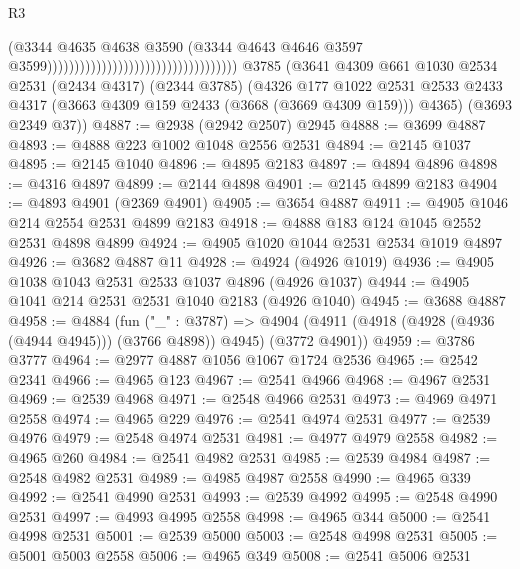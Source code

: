 \begin{lexlean}{R3}
\begin{coremodule}
                                                                      (@3344
                                                                        @4635
                                                                        @4638
                                                                        @3590
                                                                        (@3344
                                                                          @4643
                                                                          @4646
                                                                          @3597
                                                                          @3599)))))))))))))))))))))))))))))))))))
    @3785
    (@3641
      @4309
      @661
      @1030
      @2534
      @2531
      (@2434 @4317)
      (@2344 @3785)
      (@4326
        @177
        @1022
        @2531
        @2533
        @2433
        @4317
        (@3663 @4309 @159 @2433 (@3668 (@3669 @4309 @159)))
        @4365)
      (@3693 @2349 @37))
@4887 := @2938 (@2942 @2507) @2945
@4888 := @3699 @4887
@4893 := @4888 @223 @1002 @1048 @2556 @2531
@4894 := @2145 @1037
@4895 := @2145 @1040
@4896 := @4895 @2183
@4897 := @4894 @4896
@4898 := @4316 @4897
@4899 := @2144 @4898
@4901 := @2145 @4899 @2183
@4904 := @4893 @4901 (@2369 @4901)
@4905 := @3654 @4887
@4911 := @4905 @1046 @214 @2554 @2531 @4899 @2183
@4918 := @4888 @183 @124 @1045 @2552 @2531 @4898 @4899
@4924 := @4905 @1020 @1044 @2531 @2534 @1019 @4897
@4926 := @3682 @4887 @11
@4928 := @4924 (@4926 @1019)
@4936 := @4905 @1038 @1043 @2531 @2533 @1037 @4896 (@4926 @1037)
@4944 := @4905 @1041 @214 @2531 @2531 @1040 @2183 (@4926 @1040)
@4945 := @3688 @4887
@4958 := @4884
    (fun ("_" : @3787) =>
    @4904 (@4911 (@4918 (@4928 (@4936 (@4944 @4945))) (@3766 @4898)) @4945) (@3772 @4901))
@4959 := @3786 @3777
@4964 := @2977 @4887 @1056 @1067 @1724 @2536
@4965 := @2542 @2341
@4966 := @4965 @123
@4967 := @2541 @4966
@4968 := @4967 @2531
@4969 := @2539 @4968
@4971 := @2548 @4966 @2531
@4973 := @4969 @4971 @2558
@4974 := @4965 @229
@4976 := @2541 @4974 @2531
@4977 := @2539 @4976
@4979 := @2548 @4974 @2531
@4981 := @4977 @4979 @2558
@4982 := @4965 @260
@4984 := @2541 @4982 @2531
@4985 := @2539 @4984
@4987 := @2548 @4982 @2531
@4989 := @4985 @4987 @2558
@4990 := @4965 @339
@4992 := @2541 @4990 @2531
@4993 := @2539 @4992
@4995 := @2548 @4990 @2531
@4997 := @4993 @4995 @2558
@4998 := @4965 @344
@5000 := @2541 @4998 @2531
@5001 := @2539 @5000
@5003 := @2548 @4998 @2531
@5005 := @5001 @5003 @2558
@5006 := @4965 @349
@5008 := @2541 @5006 @2531

\end{coremodule}
\end{lexlean}
